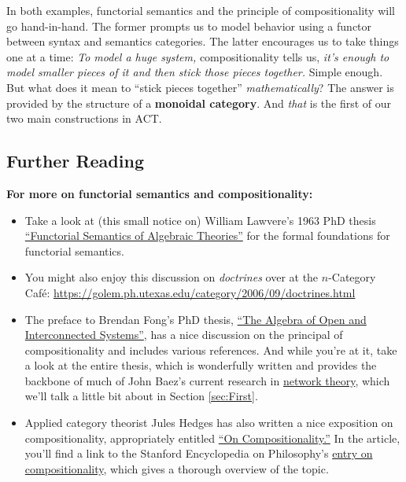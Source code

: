 \documentclass{tufte-handout-tai}
\theoremstyle{plain}
\theoremstyle{definition}
\theoremstyle{remark}
\begin{document}
In both examples, functorial semantics and the principle of compositionality will go hand-in-hand. The former prompts us to model behavior using a functor between syntax and semantics categories. The latter encourages us to take things one at a time: \textit{To model a huge system,} compositionality tells us, \textit{it's enough to model smaller pieces of it and then stick those pieces together.} Simple enough. But what does it mean to ``stick pieces together'' \textit{mathematically}? The answer is provided by the structure of a \textbf{monoidal category}. And \textit{that} is the first of our two main constructions in ACT.


\newpage
\subsection{Further Reading}
\noindent\textbf{For more on functorial semantics and compositionality:}
\begin{itemize}
	\item Take a look at (this small notice on) William Lawvere's 1963 PhD thesis \href{http://www.pnas.org/content/pnas/50/5/869.full.pdf}{``Functorial Semantics of Algebraic Theories''} for the formal foundations for functorial semantics.

	\item You might also enjoy this discussion on \textit{doctrines} over at the $n$-Category Caf{\'e}: \href{https://golem.ph.utexas.edu/category/2006/09/doctrines.html}{https://golem.ph.utexas.edu/category/2006/09/doctrines.html}

	\item The preface to Brendan Fong's PhD thesis, \href{https://arxiv.org/abs/1609.05382}{``The Algebra of Open and Interconnected Systems''}, has a nice discussion on the principal of compositionality and includes various references. And while you're at it, take a look at the entire thesis, which is wonderfully written and provides the backbone of much of John Baez's current research in \href{http://math.ucr.edu/home/baez/networks/}{network theory}, which we'll talk a little bit about in Section \ref{sec:First}.

	\item Applied category theorist Jules Hedges has also written a nice exposition on compositionality, appropriately entitled \href{https://julesh.com/2017/04/22/on-compositionality/}{``On Compositionality.''} In the article, you'll find a link to the Stanford Encyclopedia on Philosophy's \href{https://plato.stanford.edu/entries/compositionality/}{entry on compositionality}, which gives a thorough overview of the topic.
\end{itemize}
\end{document}
